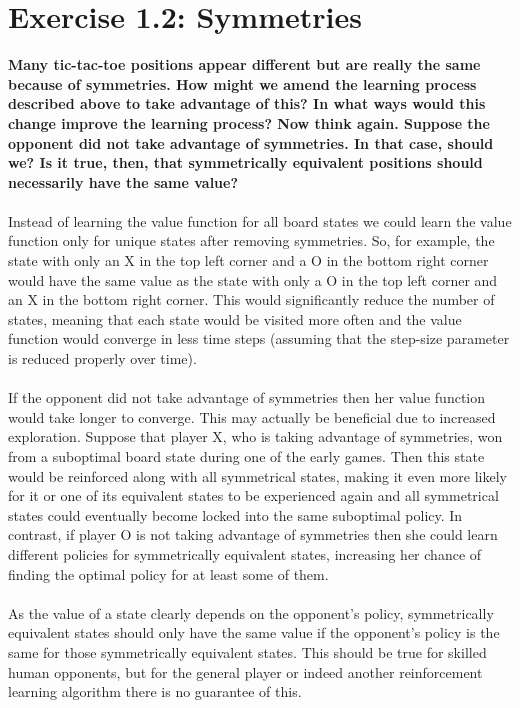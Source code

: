 \documentclass[a4paper,11pt]{article}
\numberwithin{equation}{section}
\theoremstyle{remark}
\begin{document}
\section{Exercise 1.2: Symmetries}

\textbf{Many tic-tac-toe positions appear different but are really the same because of symmetries. How might we amend the learning process described above to take advantage of this? In what ways would this change improve the learning process? Now think again. Suppose the opponent did not take advantage of symmetries. In that case, should we? Is it true, then, that symmetrically equivalent positions should necessarily have the same value?}
\\ \\
Instead of learning the value function for all board states we could learn the value function only for unique states after removing symmetries. So, for example, the state with only an X in the top left corner and a O in the bottom right corner would have the same value as the state with only a O in the top left corner and an X in the bottom right corner. This would significantly reduce the number of states, meaning that each state would be visited more often and the value function would converge in less time steps (assuming that the step-size parameter is reduced properly over time).  
\\ \\
If the opponent did not take advantage of symmetries then her value function would take longer to converge. This may actually be beneficial due to increased exploration. Suppose that player X, who is taking advantage of symmetries, won from a suboptimal board state during one of the early games. Then this state would be reinforced along with all symmetrical states, making it even more likely for it or one of its equivalent states to be experienced again and all symmetrical states could eventually become locked into the same suboptimal policy. 
In contrast, if player O is not taking advantage of symmetries then she could learn different policies for symmetrically equivalent states, increasing her chance of finding the optimal policy for at least some of them. 
\\ \\
As the value of a state clearly depends on the opponent's policy, symmetrically equivalent states should only have the same value if the opponent's policy is the same for those symmetrically equivalent states. This should be true for skilled human opponents, but for the general player or indeed another reinforcement learning algorithm there is no guarantee of this.
\end{document}
